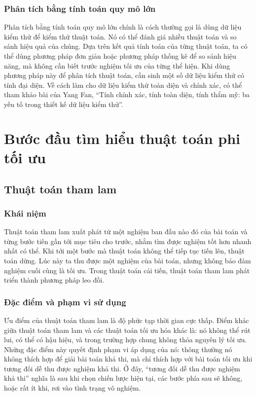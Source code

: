 \documentclass[11pt]{article}
\begin{document}
\subsubsection{Phân tích bằng tính toán quy mô lớn}

Phân tích bằng tính toán quy mô lớn chính là cách thường gọi là dùng dữ liệu
kiểm thử để kiểm thử thuật toán. Nó có thể đánh giá nhiều thuật toán và so
sánh hiệu quả của chúng. Dựa trên kết quả tính toán của từng thuật toán, ta
có thể dùng phương pháp đơn giản hoặc phương pháp thống kê để so sánh hiệu
năng, mà không cần biết trước nghiệm tối ưu của từng thể hiện. Khi dùng phương
pháp này để phân tích thuật toán, cần sinh một số dữ liệu kiểm thử có tính đại
diện. Về cách làm cho dữ liệu kiểm thử toàn diện và chính xác, có thể tham
khảo bài của Yang Fan, ``Tính chính xác, tính toàn diện, tính thẩm mỹ: ba yếu
tố trong thiết kế dữ liệu kiểm thử''.

\section{Bước đầu tìm hiểu thuật toán phi tối ưu}

\subsection{Thuật toán tham lam}

\subsubsection{Khái niệm}

Thuật toán tham lam xuất phát từ một nghiệm ban đầu nào đó của bài toán và
từng bước tiến gần tới mục tiêu cho trước, nhằm tìm được nghiệm tốt hơn nhanh
nhất có thể. Khi tới một bước mà thuật toán không thể tiếp tục tiến lên, thuật
toán dừng. Lúc này ta thu được một nghiệm của bài toán, nhưng không bảo đảm
nghiệm cuối cùng là tối ưu. Trong thuật toán cải tiến, thuật toán tham lam
phát triển thành phương pháp leo đồi.

\subsubsection{Đặc điểm và phạm vi sử dụng}

Ưu điểm của thuật toán tham lam là độ phức tạp thời gian cực thấp. Điểm khác
giữa thuật toán tham lam và các thuật toán tối ưu hóa khác là: nó không thể
rút lui, có thể có hậu hiệu, và trong trường hợp chung không thỏa nguyên lý
tối ưu. Những đặc điểm này quyết định phạm vi áp dụng của nó: thông thường nó
không thích hợp để giải bài toán khả thi, mà chỉ thích hợp với bài toán tối ưu
khi tương đối dễ thu được nghiệm khả thi. Ở đây, ``tương đối dễ thu được
nghiệm khả thi'' nghĩa là sau khi chọn chiến lược hiện tại, các bước phía sau
sẽ không, hoặc rất ít khi, rơi vào tình trạng vô nghiệm.
\end{document}
